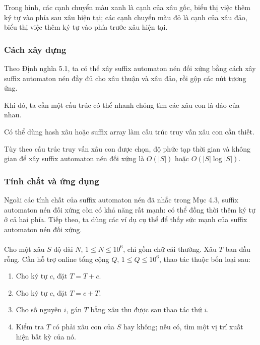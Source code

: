 \documentclass[11pt]{article}
\begin{document}
Trong hình, các cạnh chuyển màu xanh là cạnh của xâu gốc, biểu thị việc thêm ký
tự vào phía sau xâu hiện tại; các cạnh chuyển màu đỏ là cạnh của xâu đảo, biểu
thị việc thêm ký tự vào phía trước xâu hiện tại.

\subsubsection{Cách xây dựng}

Theo Định nghĩa 5.1, ta có thể xây suffix automaton nén đối xứng bằng cách xây
suffix automaton nén đầy đủ cho xâu thuận và xâu đảo, rồi gộp các nút tương
ứng.

Khi đó, ta cần một cấu trúc có thể nhanh chóng tìm các xâu con là đảo của nhau.

Có thể dùng hash xâu hoặc suffix array làm cấu trúc truy vấn xâu con cần thiết.

Tùy theo cấu trúc truy vấn xâu con được chọn, độ phức tạp thời gian và không
gian để xây suffix automaton nén đối xứng là \(O(|S|)\) hoặc
\(O(|S|\log |S|)\).

\subsubsection{Tính chất và ứng dụng}

Ngoài các tính chất của suffix automaton nén đã nhắc trong Mục 4.3, suffix
automaton nén đối xứng còn có khả năng rất mạnh: có thể đồng thời thêm ký tự ở
cả hai phía. Tiếp theo, ta dùng các ví dụ cụ thể để thấy sức mạnh của suffix
automaton nén đối xứng.

\paragraph{}
Cho một xâu \(S\) độ dài \(N\), \(1\le N\le 10^6\), chỉ gồm chữ cái thường. Xâu
\(T\) ban đầu rỗng. Cần hỗ trợ online tổng cộng \(Q\), \(1\le Q\le 10^6\), thao
tác thuộc bốn loại sau:

\begin{enumerate}
  \item Cho ký tự \(c\), đặt \(T=T+c\).
  \item Cho ký tự \(c\), đặt \(T=c+T\).
  \item Cho số nguyên \(i\), gán \(T\) bằng xâu thu được sau thao tác thứ \(i\).
  \item Kiểm tra \(T\) có phải xâu con của \(S\) hay không; nếu có, tìm một vị
  trí xuất hiện bất kỳ của nó.
\end{enumerate}
\end{document}
